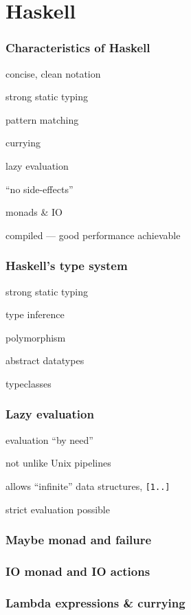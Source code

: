 \section{Haskell}

\begin{frame}
\frametitle{Characteristics of Haskell}
\bi
\item concise, clean notation
\item strong static typing
\item pattern matching
\item currying
\item lazy evaluation
\item ``no side-effects''
\item monads \& IO
\item compiled --- good performance achievable
\ei
\end{frame}

\begin{frame}
\frametitle{Haskell's type system}
\bi
\item strong static typing
\item type inference
\item polymorphism
\item abstract datatypes
\item typeclasses
\ei
\end{frame}

\begin{frame}
\frametitle{Lazy evaluation}
\bi
\item evaluation ``by need''
\item not unlike Unix pipelines
\item allows ``infinite'' data structures, \texttt{[1..]}
\item strict evaluation possible
\ei
\end{frame}

\begin{frame}
\frametitle{Maybe monad and failure}

\end{frame}

\begin{frame}
\frametitle{IO monad and IO actions}

\end{frame}

\begin{frame}
\frametitle{Lambda expressions \& currying}



\end{frame}

